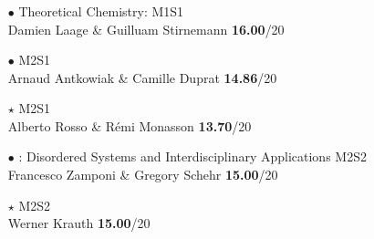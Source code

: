 \begin{frame}
	\frametitle{}
	
	\begin{itemize}
		\setlength{\itemsep}{12pt}
	\item[$\bullet$] Theoretical Chemistry:  \hfill M1S1 \\ 
	Damien Laage \& Guilluam Stirnemann \hfill \textbf{16.00}/20
	
	\item[$\bullet$]  \hfill M2S1 \\
	Arnaud Antkowiak \& Camille Duprat \hfill \textbf{14.86}/20

	\item[$\star$]  \hfill M2S1 \\ 
	Alberto Rosso \& Rémi Monasson \hfill \textbf{13.70}/20

	\item[$\bullet$] : Disordered Systems and Interdisciplinary Applications \hfill M2S2 \\
	Francesco Zamponi \& Gregory Schehr \hfill \textbf{15.00}/20
	\item[$\star$]  \hfill M2S2 \\
	Werner Krauth \hfill \textbf{15.00}/20
	

	\end{itemize}
	

\end{frame}